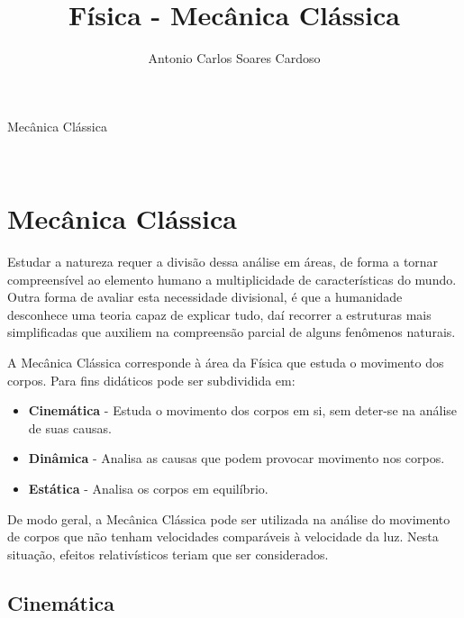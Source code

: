 \documentclass[
    12pt, %
    openright,
    twoside, %
    a4paper, %
    article,
    english,brazil %
]{abntex2}
\author{Antonio Carlos Soares Cardoso}
\title{Física - Mecânica Clássica}
\makeatletter
\renewcommand\tableofcontents{%
  \null\hfill\textbf{\Large\contentsname}\hfill\null\par
  \@mkboth{\MakeUppercase\contentsname}{\MakeUppercase\contentsname}%
  \@starttoc{toc}%
}
\makeatother
\begin{document}
\begin{capa}
    \center
    \ABNTEXchapterfont\Large Mecânica Clássica\\
    \vspace*{1cm}
    {\ABNTEXchapterfont\large\imprimirautor}
    \vfill
    \begin{center}
    \ABNTEXchapterfont\bfseries\LARGE\imprimirtitulo
    \end{center}
    \vfill
    \large\imprimirlocal \\
    \large\imprimirdata
    \vspace*{1cm}
\end{capa}

\tableofcontents

\newpage

\textual

\section{Mecânica Clássica}

Estudar a natureza requer a divisão dessa análise em áreas, de forma a tornar compreensível ao elemento humano a multiplicidade de características do mundo. Outra forma de avaliar esta necessidade divisional, é que a humanidade desconhece uma teoria capaz de explicar tudo, daí recorrer a estruturas mais simplificadas que auxiliem na compreensão parcial de alguns fenômenos naturais.

A Mecânica Clássica corresponde à área da Física que estuda o movimento dos corpos. Para fins didáticos pode ser subdividida em:

\begin{itemize}
    \item \textbf{Cinemática} - Estuda o movimento dos corpos em si, sem deter-se na análise de suas causas.
    \item \textbf{Dinâmica} - Analisa as causas que podem provocar movimento nos corpos.
    \item \textbf{Estática} - Analisa os corpos em equilíbrio.
\end{itemize}

De modo geral, a Mecânica Clássica pode ser utilizada na análise do movimento de corpos que não tenham velocidades comparáveis à velocidade da luz. Nesta situação, efeitos relativísticos teriam que ser considerados.

\subsection{Cinemática}
\end{document}

